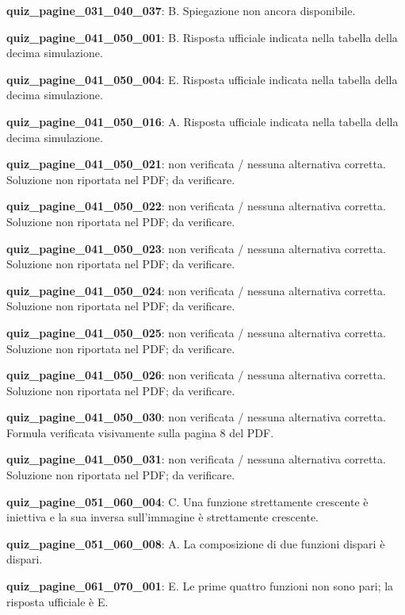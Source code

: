 \documentclass[11pt,a4paper]{article}
\newcounter{quiz}
\begin{document}
\noindent\textbf{quiz\_pagine\_031\_040\_037}: B. Spiegazione non ancora disponibile.\par\medskip
\noindent\textbf{quiz\_pagine\_041\_050\_001}: B. Risposta ufficiale indicata nella tabella della decima simulazione.\par\medskip
\noindent\textbf{quiz\_pagine\_041\_050\_004}: E. Risposta ufficiale indicata nella tabella della decima simulazione.\par\medskip
\noindent\textbf{quiz\_pagine\_041\_050\_016}: A. Risposta ufficiale indicata nella tabella della decima simulazione.\par\medskip
\noindent\textbf{quiz\_pagine\_041\_050\_021}: non verificata / nessuna alternativa corretta. Soluzione non riportata nel PDF; da verificare.\par\medskip
\noindent\textbf{quiz\_pagine\_041\_050\_022}: non verificata / nessuna alternativa corretta. Soluzione non riportata nel PDF; da verificare.\par\medskip
\noindent\textbf{quiz\_pagine\_041\_050\_023}: non verificata / nessuna alternativa corretta. Soluzione non riportata nel PDF; da verificare.\par\medskip
\noindent\textbf{quiz\_pagine\_041\_050\_024}: non verificata / nessuna alternativa corretta. Soluzione non riportata nel PDF; da verificare.\par\medskip
\noindent\textbf{quiz\_pagine\_041\_050\_025}: non verificata / nessuna alternativa corretta. Soluzione non riportata nel PDF; da verificare.\par\medskip
\noindent\textbf{quiz\_pagine\_041\_050\_026}: non verificata / nessuna alternativa corretta. Soluzione non riportata nel PDF; da verificare.\par\medskip
\noindent\textbf{quiz\_pagine\_041\_050\_030}: non verificata / nessuna alternativa corretta. Formula verificata visivamente sulla pagina 8 del PDF.\par\medskip
\noindent\textbf{quiz\_pagine\_041\_050\_031}: non verificata / nessuna alternativa corretta. Soluzione non riportata nel PDF; da verificare.\par\medskip
\noindent\textbf{quiz\_pagine\_051\_060\_004}: C. Una funzione strettamente crescente è iniettiva e la sua inversa sull'immagine è strettamente crescente.\par\medskip
\noindent\textbf{quiz\_pagine\_051\_060\_008}: A. La composizione di due funzioni dispari è dispari.\par\medskip
\noindent\textbf{quiz\_pagine\_061\_070\_001}: E. Le prime quattro funzioni non sono pari; la risposta ufficiale è E.\par\medskip
\end{document}
